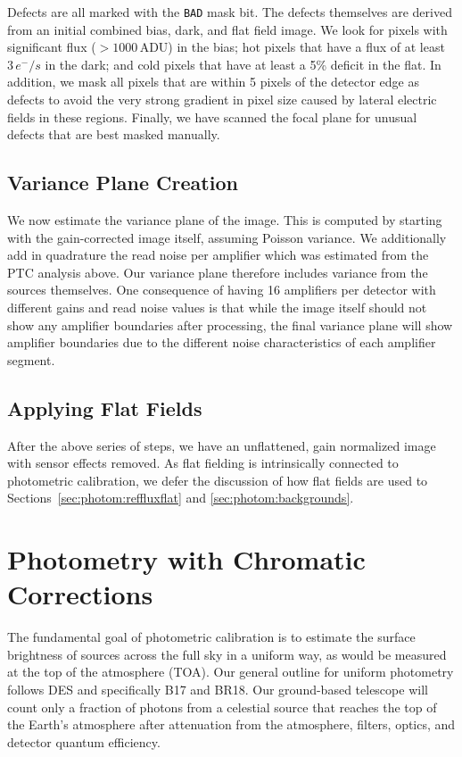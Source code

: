 \documentclass[SE,authoryear,lsstdraft,toc]{lsstdoc}
\newcommand{\etron}{e^{-}}
\begin{document}
Defects are all marked with the \texttt{BAD} mask bit.
The defects themselves are derived from an initial combined bias, dark, and flat field image.
We look for pixels with significant flux ($>1000\,\mathrm{ADU}$) in the bias; hot pixels that have a flux of at least $3\,\etron/s$ in the dark; and cold pixels that have at least a 5\% deficit in the flat.
In addition, we mask all pixels that are within 5 pixels of the detector edge as defects to avoid the very strong gradient in pixel size caused by lateral electric fields in these regions.
Finally, we have scanned the focal plane for unusual defects that are best masked manually.

\subsection{Variance Plane Creation}
\label{sec:varplane}

We now estimate the variance plane of the image.
This is computed by starting with the gain-corrected image itself, assuming Poisson variance.
We additionally add in quadrature the read noise per amplifier which was estimated from the PTC analysis above.
Our variance plane therefore includes variance from the sources themselves.
One consequence of having 16 amplifiers per detector with different gains and read noise values is that while the image itself should not show any amplifier boundaries after processing, the final variance plane will show amplifier boundaries due to the different noise characteristics of each amplifier segment.

\subsection{Applying Flat Fields}

After the above series of steps, we have an unflattened, gain normalized image with sensor effects removed.
As flat fielding is intrinsically connected to photometric calibration, we defer the discussion of how flat fields are used to Sections~\ref{sec:photom:reffluxflat} and \ref{sec:photom:backgrounds}.

\section{Photometry with Chromatic Corrections}
\label{sec:photocal}

The fundamental goal of photometric calibration is to estimate the surface brightness of sources across the full sky in a uniform way, as would be measured at the top of the atmosphere (TOA).
Our general outline for uniform photometry follows DES and specifically B17 and BR18.
Our ground-based telescope will count only a fraction of photons from a celestial source that reaches the top of the Earth's atmosphere after attenuation from the atmosphere, filters, optics, and detector quantum efficiency.
\end{document}
